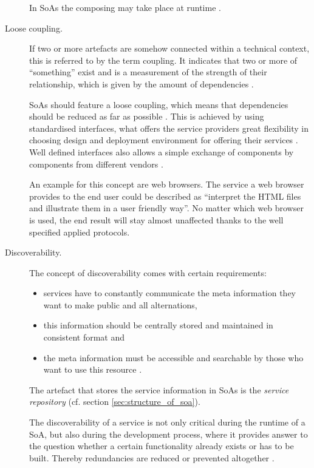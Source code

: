 \begin{description}
In SoAs the composing may take place at runtime \cite{breivold}.

\item [Loose coupling.]
If two or more artefacts are somehow connected within a technical context, this is referred to by the term coupling. It indicates that two or more of ``something'' exist and is a measurement of the strength of their relationship, which is given by the amount of dependencies \cite{erl2008}.

SoAs should feature a loose coupling, which means that dependencies should be reduced as far as possible \cite{erl2008}. This is achieved by using standardised interfaces, what offers the service providers great flexibility in choosing design and deployment environment for offering their services \cite{breivold} \cite{arrowhead}. Well defined interfaces also allows a simple exchange of components by components from different vendors \cite{scholz}.

An example for this concept are web browsers. The service a web browser provides to the end user could be described as ``interpret the HTML files and illustrate them in a user friendly way''. No matter which web browser is used, the end result will stay almost unaffected thanks to the well specified applied protocols.

\item [Discoverability.] 
The concept of discoverability comes with certain requirements:
	\begin{itemize}
	\item services have to constantly communicate the meta information they want to make public and all alternations,
	\item this information should be centrally stored and maintained in consistent format and
	\item the meta information must be accessible and searchable by those who want to use this resource \cite[ch.12.]{erl2008}.
	\end{itemize}
The artefact that stores the service information in SoAs is the \emph{service repository} (cf. section \ref{sec:structure_of_soa}).

The discoverability of a service is not only critical during the runtime of a SoA, but also during the development process, where it provides answer to the question whether a certain functionality already exists or has to be built. Thereby redundancies are reduced or prevented altogether \cite[ch.12]{erl2008} \cite{arrowhead} \cite{breivold} \cite[p.27]{erl2011}.


\end{description}
